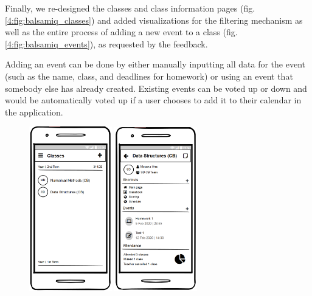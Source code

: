 Finally, we re-designed the classes and class information pages (fig. \ref{4:fig:balsamiq_classes}) and added visualizations for the filtering mechanism as well as the entire process of adding a new event to a class (fig. \ref{4:fig:balsamiq_events}), as requested by the feedback.

Adding an event can be done by either manually inputting all data for the event (such as the name, class, and deadlines for homework) or using an event that somebody else has already created. Existing events can be voted up or down and would be automatically voted up if a user chooses to add it to their calendar in the application.

\clearpage

\begin{figure}[!ht]
    \centering
     \includegraphics[width=0.32\textwidth]{figures/app/balsamiq/classes.png}
     \hfill
     \includegraphics[width=0.32\textwidth]{figures/app/balsamiq/class_info.png}

\end{figure}
